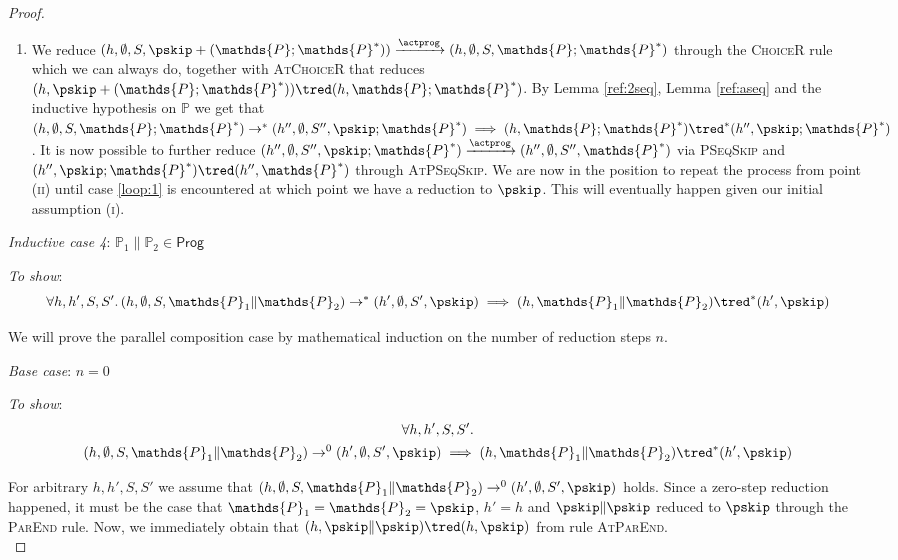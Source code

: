\begin{thm}
{\begin{proof}
\begin{enumerate}
	\item We reduce $(h, \emptyset, S, \pskip + (\mathds{P} ; \mathds{P}^*)) \xrightarrow{\actprog} (h, \emptyset, S, \mathds{P} ; \mathds{P}^*)$ through the \textsc{ChoiceR} rule which we can always do, together with \textsc{AtChoiceR} that reduces $(h, \pskip + (\mathds{P} ; \mathds{P}^*)) \tred (h, \mathds{P} ; \mathds{P}^*)$. By Lemma \ref{ref:2seq}, Lemma \ref{ref:aseq} and the inductive hypothesis on $\mathds{P}$ we get that $(h, \emptyset, S, \mathds{P} ; \mathds{P}^*) \rightarrow^* (h'', \emptyset, S'', \pskip ; \mathds{P}^*) \implies (h, \mathds{P} ; \mathds{P}^*) \tred^* (h'', \pskip ; \mathds{P}^*)$. It is now possible to further reduce $(h'', \emptyset, S'', \pskip ; \mathds{P}^*) \xrightarrow{\actprog} (h'', \emptyset, S'', \mathds{P}^*)$ via \textsc{PSeqSkip} and $(h'', \pskip ; \mathds{P}^*) \tred (h'', \mathds{P}^*)$ through \textsc{AtPSeqSkip}. We are now in the position to repeat the process from point (\textsc{ii}) until case \ref{loop:1} is encountered at which point we have a reduction to $\pskip$. This will eventually happen given our initial assumption (\textsc{i}). \\
\end{enumerate}

\textit{Inductive case 4}: $\mathds{P}_1 \| \mathds{P}_2 \in \mathsf{Prog}$

\textit{To show}:
\[
	\forall h, h', S, S' \ldotp
	(h, \emptyset, S, \mathds{P}_1 \| \mathds{P}_2) \rightarrow^* (h', \emptyset, S', \pskip) \implies 
	(h, \mathds{P}_1 \| \mathds{P}_2 ) \tred^* (h', \pskip)
\]

We will prove the parallel composition case by mathematical induction on the number of reduction steps $n$.

\textit{Base case}: $n = 0$

\textit{To show}:
\begin{gather*}
	\forall h, h', S, S' \ldotp \\
	(h, \emptyset, S, \mathds{P}_1 \| \mathds{P}_2) \rightarrow^0 (h', \emptyset, S', \pskip)
	\implies
	(h, \mathds{P}_1 \| \mathds{P}_2) \tred^* (h', \pskip)
\end{gather*}

For arbitrary $h, h', S, S'$ we assume that $(h, \emptyset, S, \mathds{P}_1 \| \mathds{P}_2) \rightarrow^0 (h', \emptyset, S', \pskip)$ holds. Since a zero-step reduction happened, it must be the case that $\mathds{P}_1 = \mathds{P}_2 = \pskip$, $h' = h$ and $\pskip \| \pskip$ reduced to $\pskip$ through the \textsc{ParEnd} rule. Now, we immediately obtain that $(h, \pskip \| \pskip) \tred (h, \pskip)$ from rule \textsc{AtParEnd}. \\


\end{proof}}
\end{thm}
